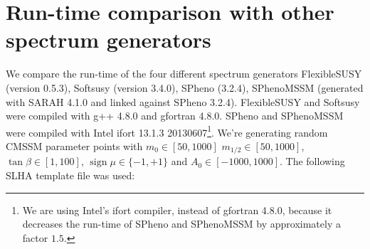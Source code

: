 \documentclass[final,3p,times,pdflatex]{elsarticle}
\DeclareMathOperator{\sign}{sign}
\begin{document}
\section{Run-time comparison with other spectrum generators}

We compare the run-time of the four different spectrum generators
FlexibleSUSY (version 0.5.3), Softsusy (version 3.4.0), SPheno
(3.2.4), SPhenoMSSM (generated with SARAH 4.1.0 and linked against
SPheno 3.2.4).  FlexibleSUSY and Softsusy were compiled with g++ 4.8.0
and gfortran 4.8.0.  SPheno and SPhenoMSSM were compiled with Intel
ifort 13.1.3 20130607\footnote{We are using Intel's ifort compiler,
  instead of gfortran 4.8.0, because it decreases the run-time of
  SPheno and SPhenoMSSM by approximately a factor $1.5$.}.  We're
generating random CMSSM parameter points with $m_0\in [50,1000]$
$m_{1/2}\in [50,1000]$, $\tan\beta\in [1,100]$, $\sign\mu\in
\{-1,+1\}$ and $A_0\in [-1000,1000]$.  The following SLHA template
file was used:
%
\end{document}

